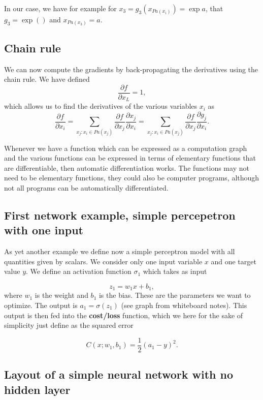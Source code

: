 \documentclass[%
oneside,                 %
final,                   %
10pt]{article}
\begin{document}
In our case, we have for example for $x_3=g_3(x_{Pa(x_i)})=\exp{a}$, that $g_3=\exp{()}$ and $x_{Pa(x_3)}=a$.

\subsection{Chain rule}

We can now compute the gradients by back-propagating the derivatives using the chain rule.
We have defined
\[
\frac{\partial f}{\partial x_L} = 1,
\]
which allows us to find the derivatives of the various variables $x_i$ as
\[
\frac{\partial f}{\partial x_i} = \sum_{x_j:x_i\in Pa(x_j)}\frac{\partial f}{\partial x_j} \frac{\partial x_j}{\partial x_i}=\sum_{x_j:x_i\in Pa(x_j)}\frac{\partial f}{\partial x_j} \frac{\partial g_j}{\partial x_i}.
\]

Whenever we have a function which can be expressed as a computation
graph and the various functions can be expressed in terms of
elementary functions that are differentiable, then automatic
differentiation works.  The functions may not need to be elementary
functions, they could also be computer programs, although not all
programs can be automatically differentiated.

\subsection{First network example, simple percepetron with one input}

As yet another example we define now a simple perceptron model with
all quantities given by scalars. We consider only one input variable
$x$ and one target value $y$.  We define an activation function
$\sigma_1$ which takes as input

\[
z_1 = w_1x+b_1,
\]
where $w_1$ is the weight and $b_1$ is the bias. These are the
parameters we want to optimize.  The output is $a_1=\sigma(z_1)$ (see
graph from whiteboard notes). This output is then fed into the
\textbf{cost/loss} function, which we here for the sake of simplicity just
define as the squared error

\[
C(x;w_1,b_1)=\frac{1}{2}(a_1-y)^2.
\]

\subsection{Layout of a simple neural network with no hidden layer}

\vspace{6mm}
\end{document}
